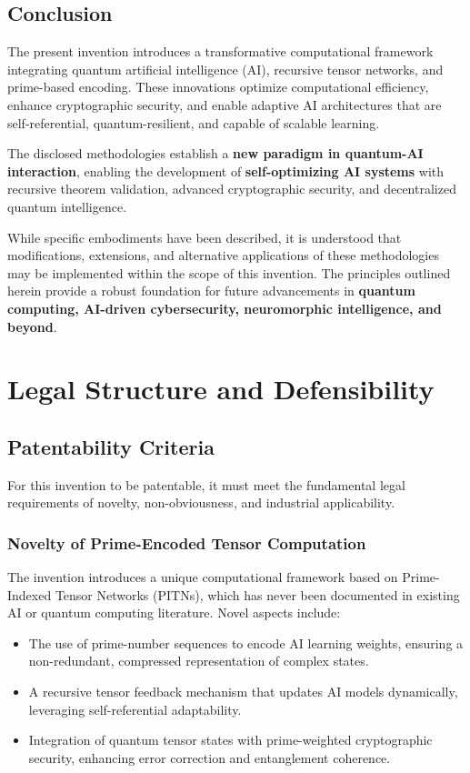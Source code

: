 \documentclass{article}
\theoremstyle{plain}
\begin{document}
\begin{itemize}
\begin{itemize}
\subsection{Conclusion}

The present invention introduces a transformative computational framework integrating quantum artificial intelligence (AI), recursive tensor networks, and prime-based encoding. These innovations optimize computational efficiency, enhance cryptographic security, and enable adaptive AI architectures that are self-referential, quantum-resilient, and capable of scalable learning.

The disclosed methodologies establish a \textbf{new paradigm in quantum-AI interaction}, enabling the development of \textbf{self-optimizing AI systems} with recursive theorem validation, advanced cryptographic security, and decentralized quantum intelligence. 

While specific embodiments have been described, it is understood that modifications, extensions, and alternative applications of these methodologies may be implemented within the scope of this invention. The principles outlined herein provide a robust foundation for future advancements in \textbf{quantum computing, AI-driven cybersecurity, neuromorphic intelligence, and beyond}.

\section{Legal Structure and Defensibility}

\subsection{Patentability Criteria}
For this invention to be patentable, it must meet the fundamental legal requirements of novelty, non-obviousness, and industrial applicability.

\subsubsection{Novelty of Prime-Encoded Tensor Computation}
The invention introduces a unique computational framework based on Prime-Indexed Tensor Networks (PITNs), which has never been documented in existing AI or quantum computing literature. Novel aspects include:
\begin{itemize}
    \item The use of prime-number sequences to encode AI learning weights, ensuring a non-redundant, compressed representation of complex states.
    \item A recursive tensor feedback mechanism that updates AI models dynamically, leveraging self-referential adaptability.
    \item Integration of quantum tensor states with prime-weighted cryptographic security, enhancing error correction and entanglement coherence.
\end{itemize}


\end{itemize}
\end{itemize}
\end{document}
